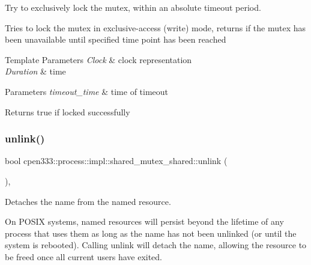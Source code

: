 Try to exclusively lock the mutex, within an absolute timeout period. 

Tries to lock the mutex in exclusive-\/access (write) mode, returns if the mutex has been unavailable until specified time point has been reached


\begin{DoxyTemplParams}{Template Parameters}
{\em Clock} & clock representation \\
\hline
{\em Duration} & time \\
\hline
\end{DoxyTemplParams}

\begin{DoxyParams}{Parameters}
{\em timeout\+\_\+time} & time of timeout \\
\hline
\end{DoxyParams}
\begin{DoxyReturn}{Returns}
true if locked successfully 
\end{DoxyReturn}
\mbox{\label{classcpen333_1_1process_1_1impl_1_1shared__mutex__shared_a8e6c759f5d5266b931ed78da04652d61}} 
\subsubsection{\texorpdfstring{unlink()}{unlink()}\hspace{0.1cm}{\footnotesize\ttfamily [1/2]}}
{\footnotesize\ttfamily bool cpen333\+::process\+::impl\+::shared\+\_\+mutex\+\_\+shared\+::unlink (\begin{DoxyParamCaption}{ }\end{DoxyParamCaption})\hspace{0.3cm}{\ttfamily [inline]}, {\ttfamily [virtual]}}



Detaches the name from the named resource. 

On P\+O\+S\+IX systems, named resources will persist beyond the lifetime of any process that uses them as long as the name has not been unlinked (or until the system is rebooted). Calling {\ttfamily unlink} will detach the name, allowing the resource to be freed once all current users have exited.

